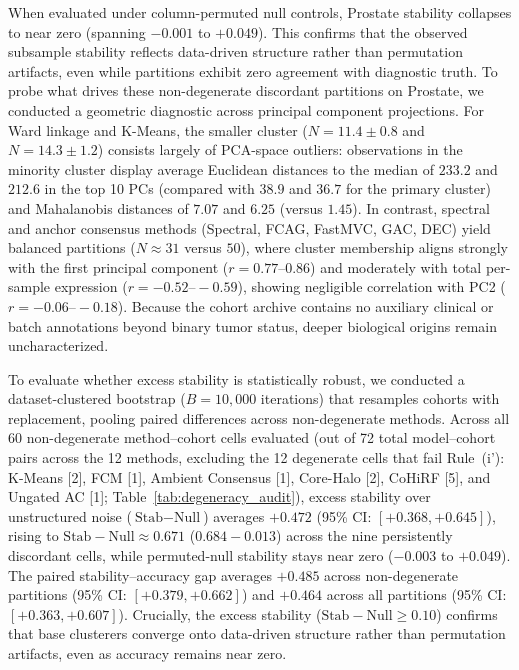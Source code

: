 \documentclass[pdflatex,sn-mathphys-num]{sn-jnl}
\theoremstyle{thmstyleone}
\theoremstyle{thmstyletwo}
\theoremstyle{thmstylethree}
\begin{document}
When evaluated under column-permuted null controls, Prostate stability collapses to near zero (spanning $-0.001$ to $+0.049$). This confirms that the observed subsample stability reflects data-driven structure rather than permutation artifacts, even while partitions exhibit zero agreement with diagnostic truth. To probe what drives these non-degenerate discordant partitions on Prostate, we conducted a geometric diagnostic across principal component projections. For Ward linkage and K-Means, the smaller cluster ($N=11.4 \pm 0.8$ and $N=14.3 \pm 1.2$) consists largely of PCA-space outliers: observations in the minority cluster display average Euclidean distances to the median of $233.2$ and $212.6$ in the top 10 PCs (compared with $38.9$ and $36.7$ for the primary cluster) and Mahalanobis distances of $7.07$ and $6.25$ (versus $1.45$). In contrast, spectral and anchor consensus methods (Spectral, FCAG, FastMVC, GAC, DEC) yield balanced partitions ($N \approx 31$ versus $50$), where cluster membership aligns strongly with the first principal component ($r = 0.77\text{--}0.86$) and moderately with total per-sample expression ($r = -0.52\text{--}-0.59$), showing negligible correlation with PC2 ($r = -0.06\text{--}-0.18$). Because the cohort archive contains no auxiliary clinical or batch annotations beyond binary tumor status, deeper biological origins remain uncharacterized.

To evaluate whether excess stability is statistically robust, we conducted a dataset-clustered bootstrap ($B=10{,}000$ iterations) that resamples cohorts with replacement, pooling paired differences across non-degenerate methods. Across all 60 non-degenerate method--cohort cells evaluated (out of 72 total model--cohort pairs across the 12 methods, excluding the 12 degenerate cells that fail Rule~(i'): K-Means [2], FCM [1], Ambient Consensus [1], Core-Halo [2], CoHiRF [5], and Ungated AC [1]; Table~\ref{tab:degeneracy_audit}), excess stability over unstructured noise ($\text{Stab} - \text{Null}$) averages $+0.472$ (95\% CI: $[+0.368, +0.645]$), rising to $\text{Stab} - \text{Null} \approx 0.671$ ($0.684 - 0.013$) across the nine persistently discordant cells, while permuted-null stability stays near zero ($-0.003$ to $+0.049$). The paired stability--accuracy gap averages $+0.485$ across non-degenerate partitions (95\% CI: $[+0.379, +0.662]$) and $+0.464$ across all partitions (95\% CI: $[+0.363, +0.607]$). Crucially, the excess stability ($\text{Stab} - \text{Null} \ge 0.10$) confirms that base clusterers converge onto data-driven structure rather than permutation artifacts, even as accuracy remains near zero.
\end{document}
